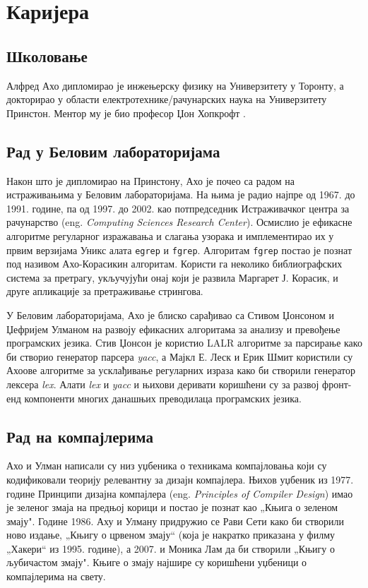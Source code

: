 \documentclass[a4paper]{article}
\begin{document}
\section{Каријера}
\label{sec:naslov1}
\subsection{Школовање}
\label{subsec:podnaslov1}

Алфред Ахо дипломирао је инжењерску физику на Универзитету у Торонту, а  докторирао у области електротехнике/рачунарских наука на Универзитету Принстон. Ментор му је био професор Џон Хопкрофт \cite{johnh}.

\subsection{Рад у Беловим лабораторијама}
\label{subsec:podnaslov2}
Након што је дипломирао на Принстону, Ахо је почео са радом на истраживањима у Беловим лабораторијама. На њима је радио најпре од 1967. до 1991. године, па од 1997. до 2002. као потпредседник Истраживачког центра за рачунарство (eng. \emph{Computing Sciences Research Center}). Осмислио је ефикасне алгоритме регуларног изражавања и слагања узорака и имплементирао их у првим верзијама Уникс алата \verb|egrep| и \verb|fgrep|. Алгоритам \verb|fgrep| постао је познат под називом Ахо-Корасикин алгоритам. Користи га неколико библиографских система за претрагу, укључујући онај који је развила Маргарет Ј. Корасик, и друге апликације за претраживање стрингова. 

У Беловим лабораторијама, Ахо је блиско сарађивао са Стивом Џонсоном и Џефријем Улманом на развоју ефикасних алгоритама за анализу и превођење програмских језика. Стив Џонсон је користио LALR алгоритме за парсирање како би створио генератор парсера \emph{yacc}, а Мајкл Е. Леск и Ерик Шмит користили су Ахоове алгоритме за усклађивање регуларних израза како би створили генератор лексера \emph{lex}. Алати \emph{lex} и \emph{yacc} и њихови деривати коришћени су за развој фронт-енд компоненти многих данашњих преводилаца програмских језика. 

\subsection{Рад на компајлерима}
\label{subsec:podnaslov3}
Ахо и Улман написали су низ уџбеника о техникама компајловања који су кодификовали теорију релевантну за дизајн компајлера. Њихов уџбеник из 1977. године Принципи дизајна компајлера (eng. \emph{Principles of Compiler Design}) имао је зеленог змаја на предњој корици и постао је познат као „Књига о зеленом змају". Године 1986. Аху и Улману придружио се Рави Сети како би створили ново издање, „Књигу о црвеном змају“ (која је накратко приказана у филму „Хакери“ из 1995. године), а 2007. и Моника Лам да би створили „Књигу о љубичастом змају". Књиге о змају најшире су коришћени уџбеници о компајлерима на свету. 
\end{document}

